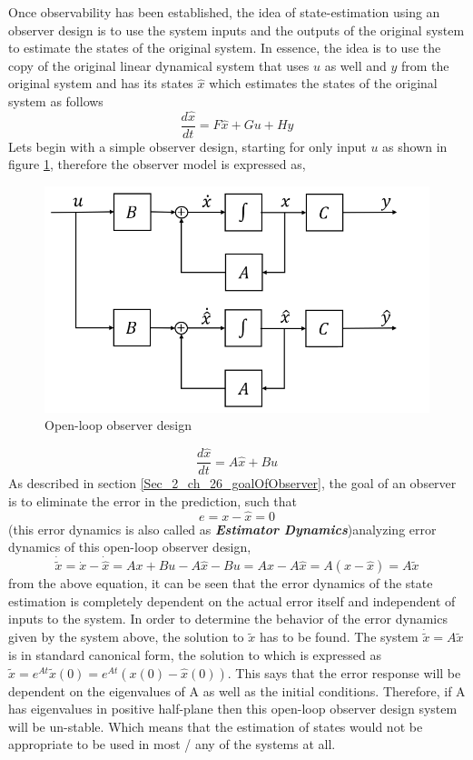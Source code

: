 Once observability has been established, the idea of state-estimation using an observer design is to use the system inputs and the outputs of the original system to estimate the states of the original system. In essence, the idea is to use the copy of the original linear dynamical system that uses $u$ as well and $y$ from the original system and has its states $\hat{x}$ which estimates the states of the original system as follows
\begin{equation} \label{eq_2_ch_26_ObserverDesign_prototype}
\frac{d \hat{x}}{dt} = F \hat{x} + Gu + Hy
\end{equation}
Lets begin with a simple observer design, starting for only input $u$ as shown in figure \ref{fig_2_ch_26_ObserverDeisgn1}, therefore the observer model is expressed as,
\begin{figure}[h!]
	\centering
	\includegraphics[width=0.6\linewidth]{Bilder/ObserverDesgin1.png}
	\caption{Open-loop observer design}
	\label{fig_2_ch_26_ObserverDeisgn1}
\end{figure}
\begin{equation}
\frac{d \hat{x}}{dt} = A \hat{x} + Bu
\end{equation}
As described in section \ref{Sec_2_ch_26_goalOfObserver}, the goal of an observer is to eliminate the error in the prediction, such that
\begin{equation}
e = x - \hat{x} = 0
\end{equation}
(this error dynamics is also called as \textbf{\textit{Estimator Dynamics}})analyzing error dynamics of this open-loop observer design,
\begin{equation}
\dot{\tilde{x}} = \dot{x} - \dot{\hat{x}} = A {x} + Bu - A \hat{x} - Bu = A {x} - A \hat{x} = A (x - \hat{x}) = A {\tilde{x}}
\end{equation}
from the above equation, it can be seen that the error dynamics of the state estimation is completely dependent on the actual error itself and independent of inputs to the system. In order to determine the behavior of the error dynamics given by the system above, the solution to $\tilde{x}$ has to be found. The system $\dot{\tilde{x}} = A {\tilde{x}}$ is in standard canonical form, the solution to which is expressed as $\tilde{x} = e^{At}\tilde{x}(0) = e^{At}(x(0) - \hat{x}(0))$. This says that the error response will be dependent on the eigenvalues of A as well as the initial conditions. Therefore, if A has eigenvalues in positive half-plane then this open-loop observer design system will be un-stable. Which means that the estimation of states would not be appropriate to be used in most / any of the systems at all.

